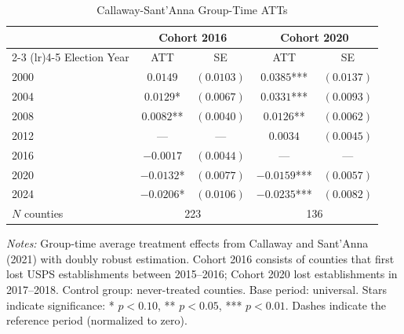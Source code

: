 \begin{table}[htbp]
\centering
\caption{Callaway-Sant'Anna Group-Time ATTs}
\label{tab:event}
\begin{tabular}{lcccc}
\hline\hline
 & \multicolumn{2}{c}{Cohort 2016} & \multicolumn{2}{c}{Cohort 2020} \\
\cmidrule(lr){2-3} \cmidrule(lr){4-5}
Election Year & ATT & SE & ATT & SE \\
\hline
2000 & $0.0149$ & $(0.0103)$ & $0.0385$*** & $(0.0137)$ \\
2004 & $0.0129$* & $(0.0067)$ & $0.0331$*** & $(0.0093)$ \\
2008 & $0.0082$** & $(0.0040)$ & $0.0126$** & $(0.0062)$ \\
2012 & --- & --- & $0.0034$ & $(0.0045)$ \\
2016 & $-0.0017$ & $(0.0044)$ & --- & --- \\
2020 & $-0.0132$* & $(0.0077)$ & $-0.0159$*** & $(0.0057)$ \\
2024 & $-0.0206$* & $(0.0106)$ & $-0.0235$*** & $(0.0082)$ \\
\hline
$N$ counties & \multicolumn{2}{c}{223} & \multicolumn{2}{c}{136} \\
\hline\hline
\end{tabular}
\begin{tablenotes}
\small
\item \textit{Notes:} Group-time average treatment effects from Callaway and Sant'Anna (2021) with doubly robust estimation. Cohort 2016 consists of counties that first lost USPS establishments between 2015--2016; Cohort 2020 lost establishments in 2017--2018. Control group: never-treated counties. Base period: universal. Stars indicate significance: * $p<0.10$, ** $p<0.05$, *** $p<0.01$. Dashes indicate the reference period (normalized to zero).
\end{tablenotes}
\end{table}
